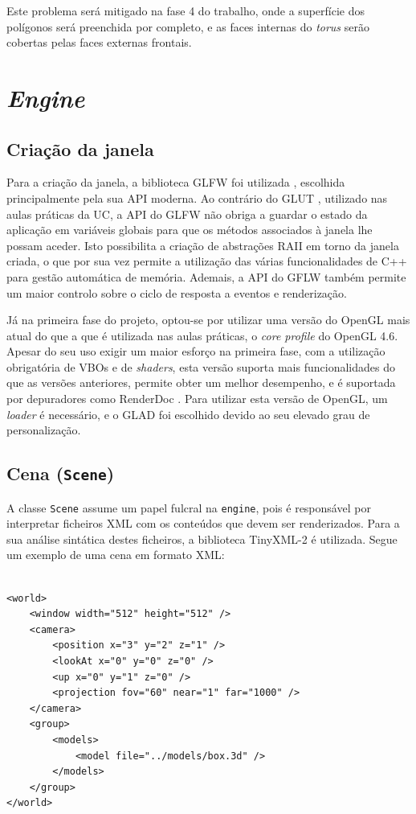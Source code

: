 \documentclass[12pt, a4paper]{article}
\begin{document}
Este problema será mitigado na fase 4 do trabalho, onde a superfície dos polígonos será preenchida
por completo, e as faces internas do \emph{torus} serão cobertas pelas faces externas frontais.

\section{\emph{Engine}}

\subsection{Criação da janela}

Para a criação da janela, a biblioteca GLFW foi utilizada \cite{glfw}, escolhida principalmente pela
sua API moderna. Ao contrário do GLUT \cite{glut}, utilizado nas aulas práticas da UC, a API do GLFW
não obriga a guardar o estado da aplicação em variáveis globais para que os métodos associados à
janela lhe possam aceder. Isto possibilita a criação de abstrações RAII em torno da janela criada, o
que por sua vez permite a utilização das várias funcionalidades de C++ para gestão automática de
memória. Ademais, a API do GFLW também permite um maior controlo sobre o ciclo de resposta a eventos
e renderização.

Já na primeira fase do projeto, optou-se por utilizar uma versão do OpenGL mais atual do que a que é
utilizada nas aulas práticas, o \emph{core profile} do OpenGL 4.6. Apesar do seu uso exigir um maior
esforço na primeira fase, com a utilização obrigatória de VBOs e de \emph{shaders}, esta versão
suporta mais funcionalidades do que as versões anteriores, permite obter um melhor desempenho, e é
suportada por depuradores como RenderDoc \cite{renderdoc}. Para utilizar esta versão de OpenGL, um
\emph{loader} é necessário, e o GLAD \cite{glad} foi escolhido devido ao seu elevado grau de
personalização.

\subsection{Cena (\texttt{Scene})}

A classe \texttt{Scene} assume um papel fulcral na \texttt{engine}, pois é responsável por
interpretar ficheiros XML com os conteúdos que devem ser renderizados. Para a sua análise sintática
destes ficheiros, a biblioteca TinyXML-2 \cite{tinyxml2} é utilizada. Segue um exemplo de
uma cena em formato XML:

\lstset{language=xml}
\begin{lstlisting}

<world>
    <window width="512" height="512" />
    <camera>
        <position x="3" y="2" z="1" />
        <lookAt x="0" y="0" z="0" />
        <up x="0" y="1" z="0" />
        <projection fov="60" near="1" far="1000" />
    </camera>
    <group>
        <models>
            <model file="../models/box.3d" />
        </models>
    </group>
</world>
\end{lstlisting}
\end{document}

